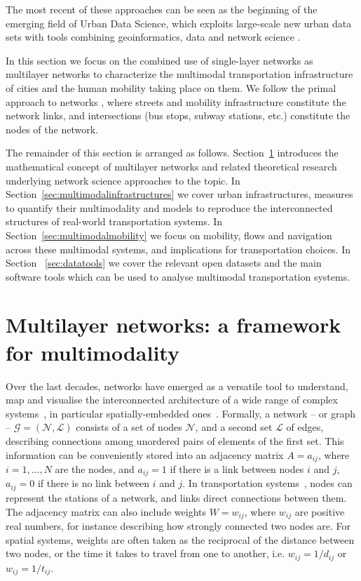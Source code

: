 The most recent of these approaches can be seen as the beginning of the emerging field of Urban Data Science, which exploits large-scale new urban data sets with tools combining geoinformatics, data and network science \cite{organizers2019roundtable,resch2019hds}.

In this section we focus on the combined use of single-layer networks as multilayer networks to characterize the multimodal transportation infrastructure of cities and the human mobility taking place on them. We follow the primal approach to networks \cite{porta2006primal}, where streets and mobility infrastructure constitute the network links, and intersections (bus stops, subway stations, etc.) constitute the nodes of the network.

The remainder of this section is arranged as follows. Section~\ref{sec:multilayernetworks} introduces the mathematical concept of multilayer networks and related theoretical research underlying network science approaches to the topic. In Section~\ref{sec:multimodalinfrastructures} we cover urban infrastructures, measures to quantify their multimodality and models to reproduce the interconnected structures of real-world transportation systems. In Section~\ref{sec:multimodalmobility} we focus on mobility, flows and navigation across these multimodal systems, and implications for transportation choices. In Section ~\ref{sec:datatools} we cover the relevant open datasets and the main software tools which can be used to analyse multimodal transportation systems. %

\section{Multilayer networks: a framework for multimodality}\label{sec:multilayernetworks}

Over the last decades, networks have emerged as a versatile tool to understand, map and visualise the interconnected architecture of a wide range of complex systems~\cite{albert2002statistical,dorogovtsev2002evolution, newman2003structure, boccaletti2006complex}, in particular spatially-embedded ones~\cite{barthelemy2011spatial}. Formally, a network -- or graph -- $\mathcal G = (\mathcal N, \mathcal L)$ consists of a set of nodes $\mathcal N$, and a second set $\mathcal L$ of edges, describing connections among unordered pairs of elements of the first set. This information can be conveniently stored into an adjacency matrix ${A=a_{ij}}$, where $i=1, \dots, N$ are the nodes, and $a_{ij}=1$ if there is a link between nodes $i$ and $j$, $a_{ij}=0$ if there is no link between $i$ and $j$. In transportation systems~\cite{lin2013complex}, nodes can represent the stations of a network, and links direct connections between them. The adjacency matrix can also include weights $W=w_{ij}$, where $w_{ij}$ are positive real numbers, for instance describing how strongly connected two nodes are. For spatial systems, weights are often taken as the reciprocal of the distance between two nodes, or the time it takes to travel from one to another, i.e. $w_{ij}=1/d_{ij}$ or $w_{ij}=1/t_{ij}$.

